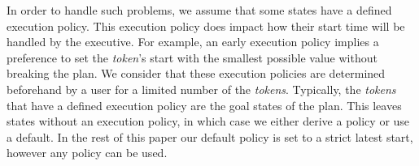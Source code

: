 In order to handle such problems, we assume that some states have a
defined execution policy. This execution policy does impact how their
start time will be handled by the executive. For example, an
early execution policy  implies a preference to set the {\em token}'s
start with the smallest possible value without breaking the plan. We
consider that these  execution policies are determined beforehand by 
a user for a limited number of the {\em tokens}. Typically, the {\em
  tokens} that have a defined execution policy are the goal states 
of the plan. This leaves states without an execution policy, 
in which case we either derive a policy or use a default. In the rest
of this paper our default policy is set to a strict latest start,
however any policy can be used.






